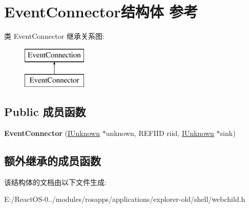 \hypertarget{struct_event_connector}{}\section{Event\+Connector结构体 参考}
\label{struct_event_connector}
类 Event\+Connector 继承关系图\+:\begin{figure}[H]
\begin{center}
\leavevmode
\includegraphics[height=2.000000cm]{struct_event_connector}
\end{center}
\end{figure}
\subsection*{Public 成员函数}
\begin{DoxyCompactItemize}
\item 
\mbox{\label{struct_event_connector_a6c9e97f1d36daec6529e9d90f07822a5}} 
{\bfseries Event\+Connector} (\hyperlink{interface_i_unknown}{I\+Unknown} $\ast$unknown, R\+E\+F\+I\+ID riid, \hyperlink{interface_i_unknown}{I\+Unknown} $\ast$sink)
\end{DoxyCompactItemize}
\subsection*{额外继承的成员函数}


该结构体的文档由以下文件生成\+:\begin{DoxyCompactItemize}
\item 
E\+:/\+React\+O\+S-\/0../modules/rosapps/applications/explorer-\/old/shell/webchild.\+h\end{DoxyCompactItemize}
